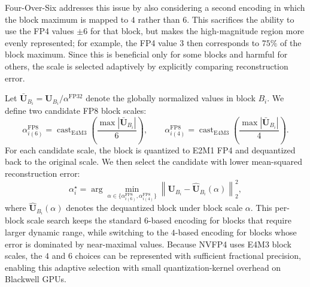 Four-Over-Six addresses this issue by also considering a second encoding in which the block maximum is mapped to $4$ rather than $6$. This sacrifices the ability to use the FP4 values $\pm6$ for that block, but makes the high-magnitude region more evenly represented; for example, the FP4 value $3$ then corresponds to $75\%$ of the block maximum. Since this is beneficial only for some blocks and harmful for others, the scale is selected adaptively by explicitly comparing reconstruction error.

Let $\bar{\mathbf{U}}_{B_i} = \mathbf{U}_{B_i} / \alpha^{\text{FP32}}$ denote the globally normalized values in block $B_i$. We define two candidate FP8 block scales:
\begin{equation}
    \alpha^{\text{FP8}}_{i(6)} =
    \operatorname{cast}_{\mathrm{E4M3}}\!\left(
    \frac{\operatorname{max}|\bar{\mathbf{U}}_{B_i}|}{6}
    \right),\qquad
    \alpha^{\text{FP8}}_{i(4)} =
    \operatorname{cast}_{\mathrm{E4M3}}\!\left(
    \frac{\operatorname{max}|\bar{\mathbf{U}}_{B_i}|}{4}
    \right).
\end{equation}
For each candidate scale, the block is quantized to E2M1 FP4 and dequantized back to the original scale. We then select the candidate with lower mean-squared reconstruction error:
\begin{equation}\label{eq:4o6}
\alpha_i^\star=\arg\min_{\alpha \in \{\alpha^{\text{FP8}}_{i(6)}, \alpha^{\text{FP8}}_{i(4)}\}}
\left\|
\mathbf{U}_{B_i} - \hat{\mathbf{U}}_{B_i}(\alpha)
\right\|_2^2,
\end{equation}
where $\hat{\mathbf{U}}_{B_i}(\alpha)$ denotes the dequantized block under block scale $\alpha$. This per-block scale search keeps the standard $6$-based encoding for blocks that require larger dynamic range, while switching to the $4$-based encoding for blocks whose error is dominated by near-maximal values. Because NVFP4 uses E4M3 block scales, the $4$ and $6$ choices can be represented with sufficient fractional precision, enabling this adaptive selection with small quantization-kernel overhead on Blackwell GPUs.


